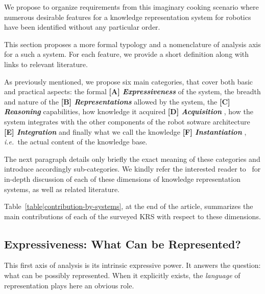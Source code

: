 \documentclass[journal]{IEEEtran}
\newcommand{\ie}{{\textit{i.e.\ }}}
\newcommand{\taxon}[2]{%
    \textbf{[#1] \emph{#2}}
}
\begin{document}
We propose to organize requirements from this imaginary cooking scenario where
numerous desirable features for a knowledge representation system for robotics
have been identified without any particular order.

This section proposes a more formal typology and a nomenclature of analysis
axis for a such a system. For each feature, we provide a short definition along
with links to relevant literature.

As previously mentioned, we propose six main categories, that cover both basic
and practical aspects: the formal
\taxon{A}{Expressiveness} of the system, the breadth and nature
of the \taxon{B}{Representations} allowed by the system, the
\taxon{C}{Reasoning} capabilities, how knowledge it acquired
\taxon{D}{Acquisition}, how the system integrates with the other components of
the robot sotware architecture \taxon{E}{Integration} and finally what we call
the knowledge \taxon{F}{Instantiation}, \ie the actual content of the knowledge
base.

The next paragraph details only briefly the exact meaning of these categories
and introduce accordingly sub-categories. We kindly refer the interested reader
to~\cite{lemaignan2012symbolic} for in-depth discussion of each of these
dimensions of knowledge representation systems, as well as related literature.

Table~\ref{table|contribution-by-systems}, at the end of the article, summarizes
the main contributions of each of the surveyed KRS with respect to these
dimensions.

\subsection{Expressiveness: What Can be Represented?}
\label{sect|expressiveness}

This first axis of analysis is its intrinsic expressive power. It answers the
question: what can be possibly represented. When it explicitly exists, the
\emph{language} of representation plays here an obvious role.
\end{document}
